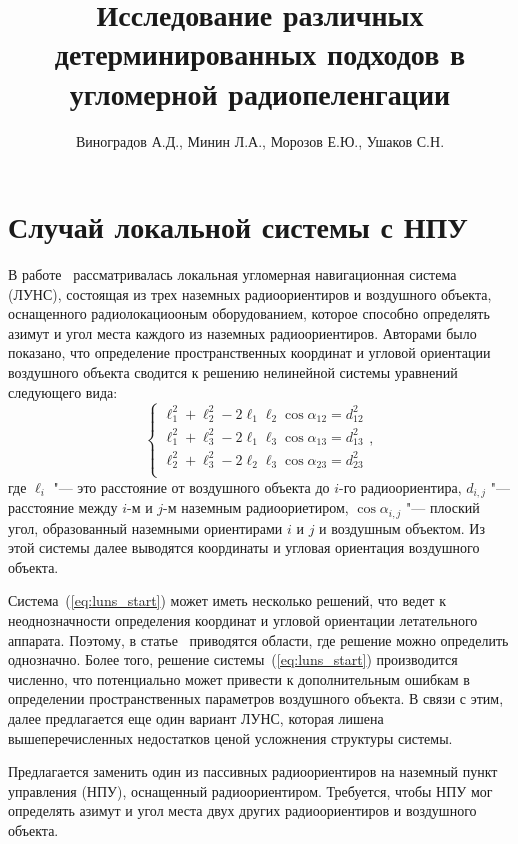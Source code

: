 \documentclass[a4paper,12pt]{article}
\author{Виноградов А.Д., Минин Л.А., Морозов Е.Ю., Ушаков С.Н.}
\title{Исследование различных детерминированных подходов в угломерной радиопеленгации}
\date{}
\begin{document}
\maketitle

\section{Случай локальной системы с НПУ}
В работе~\cite{antennas} рассматривалась локальная угломерная навигационная система (ЛУНС),
состоящая из трех наземных радиоориентиров и воздушного объекта, оснащенного радиолокациооным
оборудованием, которое способно определять азимут и угол места каждого из наземных радиоориентиров.
Авторами было показано, что определение пространственных координат и угловой ориентации воздушного
объекта сводится к решению нелинейной системы уравнений следующего вида:
\begin{equation}\label{eq:luns_start}
    \begin{cases}
        \ell_1^2 + \ell_2^2 - 2 \ell_1 \ell_2 \cos \alpha_{12} = d_{12}^2 \\
        \ell_1^2 + \ell_3^2 - 2 \ell_1 \ell_3 \cos \alpha_{13} = d_{13}^2 \\
        \ell_2^2 + \ell_3^2 - 2 \ell_2 \ell_3 \cos \alpha_{23} = d_{23}^2 \\
    \end{cases},
\end{equation}
где $\ell_i$ "--- это расстояние от воздушного объекта до $i$-го радиоориентира, $d_{i,j}$
"--- расстояние между $i$-м и $j$-м наземным радиоориетиром, $\cos \alpha_{i,j}$ "---
плоский угол, образованный наземными ориентирами $i$ и $j$ и воздушным объектом. Из этой
системы далее выводятся координаты и угловая ориентация воздушного объекта.

Система~(\ref{eq:luns_start}) может иметь несколько решений, что ведет к неоднозначности определения
координат и угловой ориентации летательного аппарата. Поэтому, в статье~\cite{antennas} приводятся
области, где решение можно определить однозначно. Более того, решение системы~(\ref{eq:luns_start})
производится численно, что потенциально может привести к дополнительным ошибкам в определении
пространственных параметров воздушного объекта. В связи с этим, далее предлагается еще один
вариант ЛУНС, которая лишена вышеперечисленных недостатков ценой усложнения структуры системы.

Предлагается заменить один из пассивных радиоориентиров на наземный пункт управления (НПУ), оснащенный
радиоориентиром. Требуется, чтобы НПУ мог определять азимут и угол места двух других радиоориентиров
и воздушного объекта.
\end{document}
